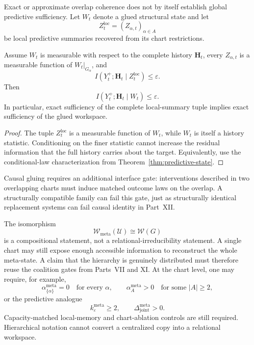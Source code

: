 
Exact or approximate overlap coherence does not by itself establish global
predictive sufficiency. Let \(W_t\) denote a glued structural state and let
\[
Z_t^{\mathrm{loc}}
=
(Z_{\alpha,t})_{\alpha\in A}
\]
be local predictive summaries recovered from its chart restrictions.

\begin{proposition}\label{prop:local-global-predictive}
Assume \(W_t\) is measurable with respect to the complete history
\(\mathbf H_t\), every \(Z_{\alpha,t}\) is a measurable function of
\(W_t|_{G_\alpha}\), and
\[
I(Y_t^+;\mathbf H_t\mid Z_t^{\mathrm{loc}})
\leq
\varepsilon.
\]
Then
\[
\boxed{
I(Y_t^+;\mathbf H_t\mid W_t)
\leq
\varepsilon.
}
\]
In particular, exact sufficiency of the complete local-summary tuple implies
exact sufficiency of the glued workspace.
\end{proposition}

\begin{proof}
The tuple \(Z_t^{\mathrm{loc}}\) is a measurable function of \(W_t\), while
\(W_t\) is itself a history statistic. Conditioning on the finer statistic
cannot increase the residual information that the full history carries about
the target. Equivalently, use the conditional-law characterization from
Theorem~\ref{thm:predictive-state}.
\end{proof}

Causal gluing requires an additional interface gate: interventions described
in two overlapping charts must induce matched outcome laws on the overlap. A
structurally compatible family can fail this gate, just as structurally
identical replacement systems can fail causal identity in Part~XII.


The isomorphism
\[
\mathscr W_{\mathrm{meta}}(\mathcal U)\cong\mathscr W(G)
\]
is a compositional statement, not a relational-irreducibility statement. A
single chart may still expose enough accessible information to reconstruct the
whole meta-state. A claim that the hierarchy is genuinely distributed must
therefore reuse the coalition gates from Parts~VII and XI. At the chart level,
one may require, for example,
\[
\alpha_{\{\alpha\}}^{\mathrm{meta}}=0
\quad\text{for every }\alpha,
\qquad
\alpha_A^{\mathrm{meta}}>0
\quad\text{for some }|A|\geq2,
\]
or the predictive analogue
\[
k_\varepsilon^{\mathrm{meta}}\geq2,
\qquad
\Delta_{\mathrm{joint}}^{\mathrm{meta}}>0.
\]
Capacity-matched local-memory and chart-ablation controls are still required.
Hierarchical notation cannot convert a centralized copy into a relational
workspace.

